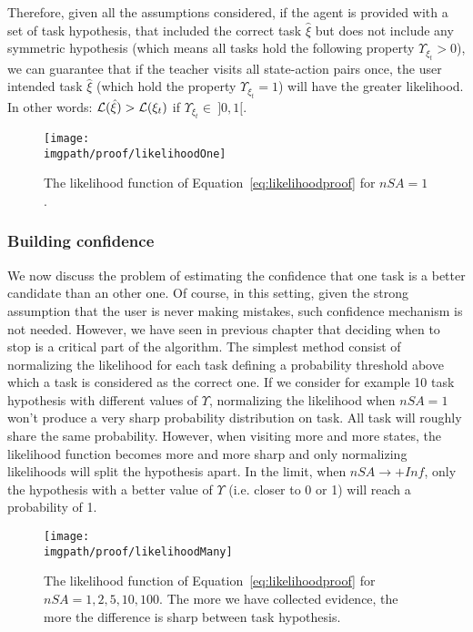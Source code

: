 Therefore, given all the assumptions considered, if the agent is provided with a set of task hypothesis, that included the correct task $\hat{\xi}$ but does not include any symmetric hypothesis (which means all tasks hold the following property $\Upsilon_{\xi_t} > 0$), we can guarantee that if the teacher visits all state-action pairs once, the user intended task $\hat{\xi}$ (which hold the property $\Upsilon_{\xi_t} = 1$) will have the greater likelihood. In other words: $\mathcal{L}(\hat{\xi}) > \mathcal{L}(\xi_t)$ if $\Upsilon_{\xi_t} \in~]0,1[$.

\begin{figure}[!htbp]
\centering
\texttt{[image: \\imgpath/proof/likelihoodOne]}
\caption{The likelihood function of Equation~\ref{eq:likelihoodproof} for $nSA =1$.}
\label{fig:prooflikelihoodone}
\end{figure}

\subsubsection*{Building confidence}

We now discuss the problem of estimating the confidence that one task is a better candidate than an other one. Of course, in this setting, given the strong assumption that the user is never making mistakes, such confidence mechanism is not needed. However, we have seen in previous chapter that deciding when to stop is a critical part of the algorithm. The simplest method consist of normalizing the likelihood for each task defining a probability threshold above which a task is considered as the correct one. If we consider for example 10 task hypothesis with different values of $\Upsilon$, normalizing the likelihood when $nSA = 1$ won't produce a very sharp probability distribution on task. All task will roughly share the same probability. However, when visiting more and more states, the likelihood function becomes more and more sharp and only normalizing likelihoods will split the hypothesis apart. In the limit, when $nSA \rightarrow +Inf$, only the hypothesis with a better value of $\Upsilon$ (i.e. closer to 0 or 1) will reach a probability of 1.

\begin{figure}[!htbp]
\centering
\texttt{[image: \\imgpath/proof/likelihoodMany]}
\caption{The likelihood function of Equation~\ref{eq:likelihoodproof} for $nSA =1,2,5,10,100$. The more we have collected evidence, the more the difference is sharp between task hypothesis.}
\label{fig:prooflikelihoodmany}
\end{figure}

